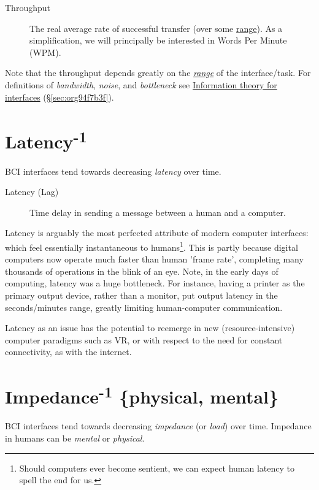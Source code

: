 \documentclass[logo,bsc,singlespacing,parskip]{infthesis}
\begin{document}
\begin{mdframed}
\begin{description}
\item[{Throughput\label{throughput}}] The real average rate of successful transfer (over some  \hyperref[range]{range}). As a simplification, we will principally be interested in Words Per Minute (WPM).
\end{description}
\end{mdframed}

Note that the throughput depends greatly on the \emph{\hyperref[range]{range}} of the interface/task.
For definitions of \emph{bandwidth}, \emph{noise}, and \emph{bottleneck} see \hyperref[sec:org94f7b3f]{Information theory for interfaces} (\S \ref{sec:org94f7b3f}).

\section{Latency\textsuperscript{-1}}
\label{sec:org242fc1a}
BCI interfaces tend towards decreasing \emph{latency} over time.

\begin{mdframed}
\begin{description}
\item[{Latency\label{latency} (Lag)}] Time delay in sending a message between a human and a computer.
\end{description}
\end{mdframed}

Latency is arguably the most perfected attribute of modern computer interfaces: which feel essentially instantaneous to humans\footnote{Should computers ever become sentient, we can expect human latency to spell the end for us.}.
This is partly because digital computers now operate much faster than human 'frame rate', completing many thousands of operations in the blink of an eye.
Note, in the early days of computing, latency was a huge bottleneck.
For instance, having a printer as the primary output device, rather than a monitor, put output latency in the seconds/minutes range, greatly limiting human-computer communication.

Latency as an issue has the potential to reemerge in new (resource-intensive) computer paradigms such as VR, or with respect to the need for constant connectivity, as with the internet.

\section{Impedance\textsuperscript{-1} \{physical, mental\}}
\label{sec:org326f2a8}
BCI interfaces tend towards decreasing \emph{impedance} (or \emph{load}) over time.
Impedance in humans can be \emph{mental} or \emph{physical}.
\end{document}
